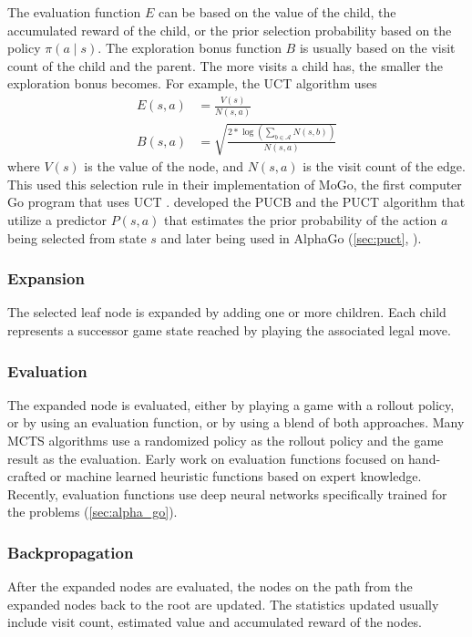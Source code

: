 The evaluation function $E$ can be based on the value of the child, the accumulated reward of the child, or the prior selection probability based on the policy $\pi(a \mid s)$.
The exploration bonus function $B$ is usually based on the visit count of the child and the parent.
The more visits a child has, the smaller the exploration bonus becomes.
For example, the UCT algorithm uses
\begin{align*}
    E(s, a)  & = \frac{V(s)}{N(s, a)}  \\
    B(s, a)  & = \sqrt{\frac{2 * \log(\sum_{b \in \mathcal{A}}N(s, b))}{N(s, a)}}
\end{align*}
where $V(s)$ is the value of the node, and $N(s, a)$ is the visit count of the edge.
This \citeauthor{ModificationUCTPatterns_Gelly.Wang.ea_2006} used this selection rule in their implementation of MoGo,
the first computer Go program that uses UCT \cite{ModificationUCTPatterns_Gelly.Wang.ea_2006}.
\citeauthor{MultiarmedBanditsEpisode_Rosin_2011} developed the PUCB and the PUCT algorithm that utilize a predictor $P(s, a)$ that estimates the prior probability of the action $a$ being selected from state $s$ and later being used in AlphaGo (\ref{sec:puct}, \cite{MultiarmedBanditsEpisode_Rosin_2011}).

\subsubsection{Expansion}
The selected leaf node is expanded by adding one or more children.
Each child represents a successor game state reached by playing the associated legal move.

\subsubsection{Evaluation}
The expanded node is evaluated, either by playing a game with a rollout policy, or by using an evaluation function, or by using a blend of both approaches.
Many MCTS algorithms use a randomized policy as the rollout policy and the game result as the evaluation.
Early work on evaluation functions focused on hand-crafted or machine learned heuristic functions based on expert knowledge.
Recently, evaluation functions use deep neural networks specifically trained for the problems (\ref{sec:alpha_go}).

\subsubsection{Backpropagation}
After the expanded nodes are evaluated, the nodes on the path from the expanded nodes back to the root are updated.
The statistics updated usually include visit count, estimated value and accumulated reward of the nodes.

